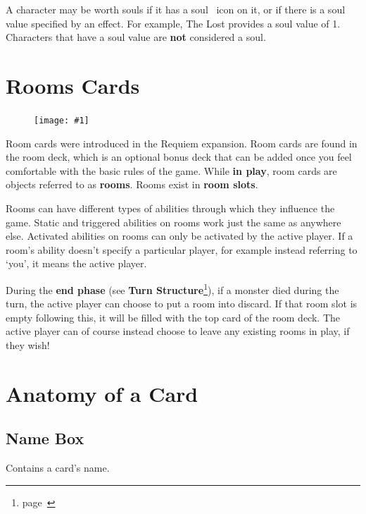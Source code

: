 \documentclass[
  fontsize=10pt,
  paper=a5,
  version=last,
  chapterprefix=true,
  bindingoffset=5mm,
  ]{scrbook}
\newcommand*{\inlineicon}[1]{%
    \raisebox{-.3\baselineskip}{%
        \smash{%
            \texttt{[image: \#1]}%
        }%
    }%
}
\newcommand{\soul}{\inlineicon{./assets/ms-soul.png}}
\newcommand{\cardv}{0.41\textwidth}
\newcommand{\cardfigh}[1]{
    \begin{figure}
        \texttt{[image: \#1]}
    \end{figure}
}
\begin{document}
    A character may be worth souls if it has a soul\soul\ icon on it, or if there is a soul value specified by an effect. For example, The Lost provides a soul value of 1. Characters that have a soul value are \textbf{not} considered a soul.

    \section{Rooms Cards}
    \cardfigh{assets/room.png}
    Room cards were introduced in the Requiem expansion. Room cards are found in the room deck, which is an optional bonus deck that can be added once you feel comfortable with the basic rules of the game. While \textbf{in play}, room cards are objects referred to as \textbf{rooms}. Rooms exist in \textbf{room slots}.

    Rooms can have different types of abilities through which they influence the game. Static and triggered abilities on rooms work just the same as anywhere else. Activated abilities on rooms can only be activated by the active player. If a room’s ability doesn’t specify a particular player, for example instead referring to ‘you’, it means the active player.

    During the \textbf{end phase} (see \textbf{Turn Structure}\footnote{page~\pageref{turn}}), if a monster died during the turn, the active player can choose to put a room into discard. If that room slot is empty following this, it will be filled with the top card of the room deck. The active player can of course instead choose to leave any existing rooms in play, if they wish!

    \section{Anatomy of a Card}
    \subsection*{Name Box} Contains a card’s name.
\end{document}
